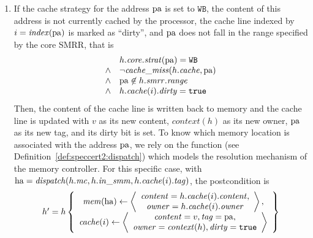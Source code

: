 \begin{enumerate}
\item If the cache strategy for the address \( \mathrm{pa} \) is set to
  \( \mathtt{WB} \), the content of this address is not currently cached by the
  processor, the cache line indexed by \( i = \mathit{index}(\mathrm{pa}) \) is
  marked as ``dirty'', and \( \mathrm{pa} \) does not fall in the range specified
  by the core SMRR, that is
  \[
    \begin{array}{cl}
      & h.\mathit{core}.\mathit{strat}(\mathrm{pa}) = \mathtt{WB} \\
      \wedge
      & \neg \mathit{cache\_miss}(h.\mathit{cache}, \mathrm{pa}) \\
      \wedge
      & \mathrm{pa} \not\in h.\mathit{smrr}.\mathit{range} \\
      \wedge
      & h.\mathit{cache}(i).\mathit{dirty} = \mathtt{true}
    \end{array}
  \]
  Then, the content of the cache line is written back to memory and the cache
  line is updated with \( v \) as its new content, \( context(h) \) as its new
  owner, \( \mathrm{pa} \) as its new tag, and its dirty bit is set.
  To know which memory location is associated with the address \( \mathrm{pa} \),
  we rely on the  function (see
  Definition~\ref{def:speccert2:dispatch}) which models the \IO resolution
  mechanism of the memory controller.
  For this specific case, with
  \( \mathrm{ha} = \mathit{dispatch}(h.\mathit{mc}, h.\mathit{in\_smm},
  h.\mathit{cache}(i).\mathit{tag}) \), the postcondition is
  \[
    \begin{array}{l}
      h' = h \left\{
      \begin{array}{c}
        \mathit{mem}(\mathrm{ha})
        \leftarrow \left<
        \begin{array}{c}
          \mathit{content} = h.\mathit{cache}(i).\mathit{content}, \\
          \mathit{owner} = h.\mathit{cache}(i).\mathit{owner} \\
        \end{array}
        \right>, \\
        \mathit{cache}(i) \leftarrow \left<
        \begin{array}{c}
          \mathit{content} = v, \mathit{tag} = \mathrm{pa}, \\
          \mathit{owner} = \mathit{context}(h), \mathit{dirty} = \mathtt{true}
        \end{array}
        \right>
      \end{array}
      \right\}
    \end{array}
\]
\end{enumerate}
